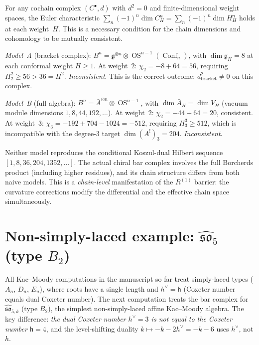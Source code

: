 \begin{remark}
\label{rem:euler-chi-obstruction}

For any cochain complex $(C^\bullet, d)$ with $d^2 = 0$ and
finite-dimensional weight spaces, the Euler characteristic
$\sum_n (-1)^n \dim C^n_H = \sum_n (-1)^n \dim H^n_H$ holds
at each weight~$H$. This is a necessary condition for
the chain dimensions and cohomology to be mutually consistent.

\medskip
\noindent\emph{Model~A} (bracket complex): $B^n = \mathfrak{g}^{\otimes n}
\otimes \operatorname{OS}^{n-1}(\operatorname{Conf}_n)$, with
$\dim \mathfrak{g}_H = 8$ at each conformal weight $H \geq 1$.
At weight~$2$: $\chi_2 = -8 + 64 = 56$, requiring
$H^2_2 \geq 56 > 36 = H^2$. \emph{Inconsistent}.
This is the correct outcome: $d_{\mathrm{bracket}}^2 \neq 0$ on this
complex.

\medskip
\noindent\emph{Model~B} (full algebra): $B^n = \bar{A}^{\otimes n}
\otimes \operatorname{OS}^{n-1}$, with $\dim \bar{A}_H = \dim V_H$
(vacuum module dimensions $1, 8, 44, 192, \ldots$).
At weight~$2$: $\chi_2 = -44 + 64 = 20$, consistent.
At weight~$3$: $\chi_3 = -192 + 704 - 1024 = -512$, requiring
$H^3_3 \geq 512$, which is incompatible with the degree-$3$ target
$\dim(A^!)_3=204$. \emph{Inconsistent}.

\medskip
Neither model reproduces the conditional Koszul-dual Hilbert sequence
$[1, 8, 36, 204, 1352, \ldots]$. The actual chiral bar
complex involves the full Borcherds product (including higher
residues), and its chain structure differs from both naive
models. This is a \emph{chain-level} manifestation of the
$R^{(1)}$ barrier: the curvature corrections modify the differential
and the effective chain space simultaneously.
\end{remark}


\section{\texorpdfstring{Non-simply-laced example:
$\widehat{\mathfrak{so}}_5$ (type $B_2$)}{Non-simply-laced example:
so-5 (type B-2)}}
\label{sec:B2-details}

All Kac--Moody computations in the manuscript so far treat
simply-laced types ($A_n$, $D_n$, $E_n$), where roots have a single length
and $h^\vee = \mathsf{h}$ (Coxeter number equals dual Coxeter number).
The next computation treats the bar complex for
$\widehat{\mathfrak{so}}_{5,k}$ (type $B_2$),
the simplest non-simply-laced affine Kac--Moody algebra. The key
difference: \emph{the dual Coxeter number $h^\vee = 3$ is not equal
to the Coxeter number $\mathsf{h} = 4$}, and the level-shifting duality
$k \mapsto -k - 2h^\vee = -k - 6$ uses $h^\vee$, not $h$.

